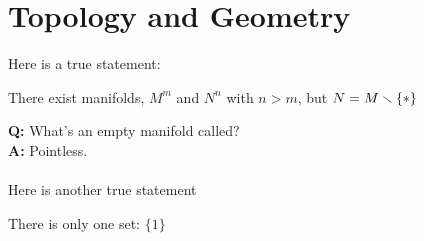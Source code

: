 \setcounter{section}{0}

\section{Topology and Geometry}
Here is a true statement:
\begin{center}
  There exist manifolds, $M^m$ and $N^n$ with $n>m$, 
  but $N = M\smallsetminus \{\ast\}$
\end{center}

\textbf{Q:} What's an empty manifold called?\\
\textbf{A:} Pointless.\\
\vspace{-0.3cm}\\
Here is another true statement
\begin{center}
  There is only one set: $\{1\}$
\end{center}

